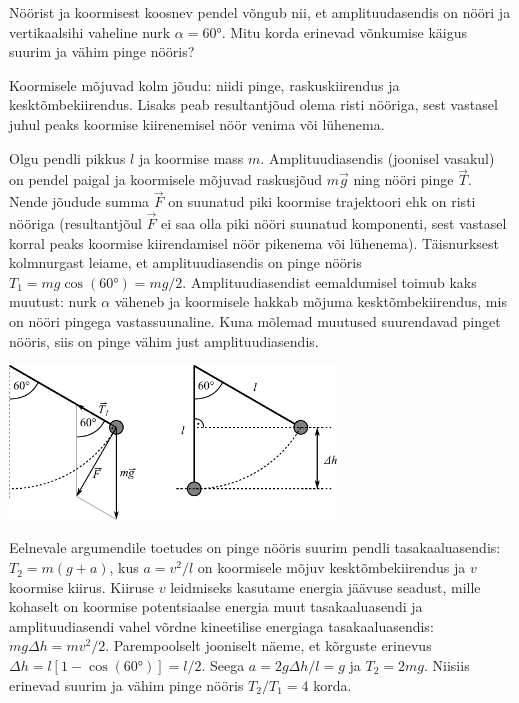 
Nöörist ja koormisest koosnev pendel võngub nii, et amplituudasendis on nööri ja vertikaalsihi vaheline nurk $\alpha=\ang{60}$. Mitu korda erinevad võnkumise käigus suurim ja vähim pinge nööris?

\hint
Koormisele mõjuvad kolm jõudu: niidi pinge, raskuskiirendus ja kesktõmbekiirendus. Lisaks peab resultantjõud olema risti nööriga, sest vastasel juhul peaks koormise kiirenemisel nöör venima või lühenema.

\solu
Olgu pendli pikkus $l$ ja koormise mass $m$. Amplituudiasendis (joonisel vasakul) on pendel paigal ja koormisele mõjuvad raskusjõud $m\vec{g}$ ning nööri pinge $\vec{T}$. Nende jõudude summa $\vec{F}$ on suunatud piki koormise trajektoori ehk on risti nööriga (resultantjõul $\vec{F}$ ei saa olla piki nööri suunatud komponenti, sest vastasel korral peaks koormise kiirendamisel nöör pikenema või lühenema). Täisnurksest kolmnurgast leiame, et amplituudiasendis on pinge nööris $T_1 = mg\cos(\ang{60}) = mg / 2$. Amplituudiasendist eemaldumisel toimub kaks muutust: nurk $\alpha$ väheneb ja koormisele hakkab mõjuma kesktõmbekiirendus, mis on nööri pingega vastassuunaline. Kuna mõlemad muutused suurendavad pinget nööris, siis on pinge vähim just amplituudiasendis.

\begin{center}
	\vspace{-10pt}
	\includegraphics[width=0.65\textwidth]{2017-v2g-03-pendel-joonis.pdf}
	\vspace{-15pt}
\end{center}

Eelnevale argumendile toetudes on pinge nööris suurim pendli tasakaaluasendis: $T_2 = m(g + a)$, kus $a = v^2 / l$ on koormisele mõjuv kesktõmbekiirendus ja $v$ koormise kiirus. Kiiruse $v$ leidmiseks kasutame energia jäävuse seadust, mille kohaselt on koormise potentsiaalse energia muut tasakaaluasendi ja amplituudiasendi vahel võrdne kineetilise energiaga tasakaaluasendis: $mg\Delta h = mv^2 / 2$. Parempoolselt jooniselt näeme, et kõrguste erinevus $\Delta h = l[1-\cos(\ang{60})] = l / 2$. Seega $a = 2g\Delta h / l = g$ ja $T_2 = 2mg$. Niisiis erinevad suurim ja vähim pinge nööris $T_2 / T_1 = 4$ korda.

